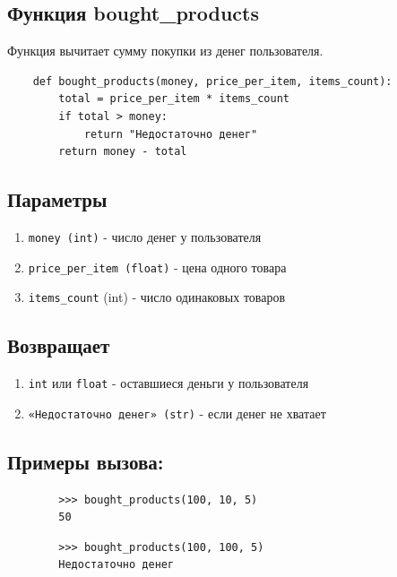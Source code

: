 \documentclass{article}
\begin{document}
    \subsection{Функция bought\_products}
    
    Функция вычитает сумму покупки из денег пользователя.
    
    \begin{verbatim}
    def bought_products(money, price_per_item, items_count):
        total = price_per_item * items_count
        if total > money:
            return "Недостаточно денег"
        return money - total
    \end{verbatim}
    
    \subsection*{Параметры}
        \begin{enumerate}
            \item \texttt{money (int)} - число денег у пользователя
            \item \texttt{price\_per\_item (float)} - цена одного товара
            \item \texttt{items\_count} (int) - число одинаковых товаров
        \end{enumerate}
        
        \subsection*{Возвращает}
        \begin{enumerate}
            \item \texttt{int} или \texttt{float} - оставшиеся деньги у пользователя
            \item \texttt{«Недостаточно денег» (str)} -  если денег не хватает
        \end{enumerate}
    
    
    \subsection*{Примеры вызова:}
        \begin{verbatim}
        >>> bought_products(100, 10, 5)
        50
        \end{verbatim}

        \begin{verbatim}
        >>> bought_products(100, 100, 5) 
        Недостаточно денег
        \end{verbatim}
        
\end{document}
